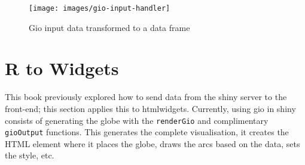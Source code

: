 \documentclass[
  10pt,
]{krantz}
\makeatletter
\newenvironment{Shaded}{\begin{snugshade}}{\end{snugshade}}
\newcommand{\CommentTok}[1]{\textcolor[rgb]{0.37,0.37,0.37}{\textit{#1}}}
\newcommand{\ControlFlowTok}[1]{\textcolor[rgb]{0.27,0.27,0.27}{\textbf{#1}}}
\newcommand{\KeywordTok}[1]{\textcolor[rgb]{0.27,0.27,0.27}{\textbf{#1}}}
\newcommand{\NormalTok}[1]{#1}
\newcommand{\OperatorTok}[1]{\textcolor[rgb]{0.43,0.43,0.43}{\textbf{#1}}}
\newcommand{\StringTok}[1]{\textcolor[rgb]{0.5,0.5,0.5}{#1}}
\newenvironment{kframe}{%
\medskip{}
\setlength{\fboxsep}{.8em}
 \def\at@end@of@kframe{}%
 \ifinner\ifhmode%
  \def\at@end@of@kframe{\end{minipage}}%
  \begin{minipage}{\columnwidth}%
 \fi\fi%
 \def\FrameCommand##1{\hskip\@totalleftmargin \hskip-\fboxsep
 \colorbox{shadecolor}{##1}\hskip-\fboxsep
     \hskip-\linewidth \hskip-\@totalleftmargin \hskip\columnwidth}%
 \MakeFramed {\advance\hsize-\width
   \@totalleftmargin\z@ \linewidth\hsize
   \@setminipage}}%
 {\par\unskip\endMakeFramed%
 \at@end@of@kframe}
\renewenvironment{Shaded}{\begin{kframe}}{\end{kframe}}
\makeatother
\begin{document}
\begin{Shaded}
\end{Shaded}

\begin{figure}[H]

{\centering \texttt{[image: images/gio-input-handler]} 

}

\caption{Gio input data transformed to a data frame}\label{fig:gio-input-handler}
\end{figure}

\hypertarget{shiny-widgets-r-to-widgets}{%
\section{R to Widgets}\label{shiny-widgets-r-to-widgets}}

This book previously explored how to send data from the shiny server to the front-end; this section applies this to htmlwidgets. Currently, using gio in shiny consists of generating the globe with the \texttt{renderGio} and complimentary \texttt{gioOutput} functions. This generates the complete visualisation, it creates the HTML element where it places the globe, draws the arcs based on the data, sets the style, etc.
\end{document}

